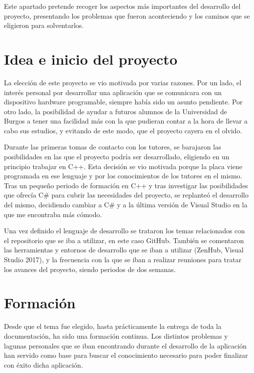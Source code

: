 
Este apartado pretende recoger los aspectos más importantes del desarrollo del proyecto, presentando los problemas que fueron aconteciendo y los caminos que se eligieron para solventarlos.

\section{Idea e inicio del proyecto}

La elección de este proyecto se vio motivada por varias razones. Por un lado, el interés personal por desarrollar una aplicación que se comunicara con un dispositivo hardware programable, siempre había sido un asunto pendiente. Por otro lado, la posibilidad de ayudar a futuros alumnos de la Universidad de Burgos a tener una facilidad más con la que pudieran contar a la hora de llevar a cabo sus estudios, y evitando de este modo, que el proyecto cayera en el olvido.

Durante las primeras tomas de contacto con los tutores, se barajaron las posibilidades en las que el proyecto podría ser desarrollado, eligiendo en un principio trabajar en C++. Esta decisión se vio motivada porque la placa viene programada en ese lenguaje y por los conocimientos de los tutores en el mismo. Tras un pequeño periodo de formación en C++ y tras investigar las posibilidades que ofrecía C\# para cubrir las necesidades del proyecto, se replanteó el desarrollo del mismo, decidiendo cambiar a C\# y a la última versión de Visual Studio en la que me encontraba más cómodo.

Una vez definido el lenguaje de desarrollo se trataron los temas relacionados con el repositorio que se iba a utilizar, en este caso GitHub. También se comentaron las herramientas y entornos de desarrollo que se iban a utilizar (ZenHub, Visual Studio 2017), y la frecuencia con la que se iban a realizar reuniones para tratar los avances del proyecto, siendo periodos de dos semanas.

\section{Formación}

Desde que el tema fue elegido, hasta prácticamente la entrega de toda la documentación, ha sido una formación continua. Los distintos problemas y lagunas personales que se iban encontrando durante el desarrollo de la aplicación han servido como base para buscar el conocimiento necesario para poder finalizar con éxito dicha aplicación.

